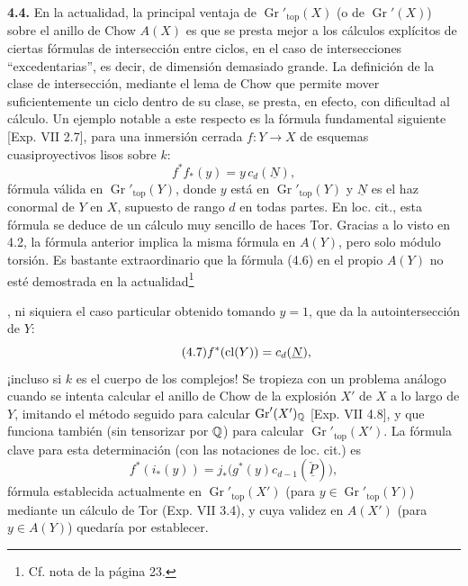 \textbf{4.4.} En la actualidad, la principal ventaja de
$\operatorname{Gr}'_{\mathrm{top}}(X)$ (o de $\operatorname{Gr}'(X)$) sobre
el anillo de Chow $A(X)$ es que se presta mejor a los cálculos explícitos de
ciertas fórmulas de intersección entre ciclos, en el caso de intersecciones
``excedentarias'', es decir, de dimensión demasiado grande. La definición de
la clase de intersección, mediante el lema de Chow que permite mover
suficientemente un ciclo dentro de su clase, se presta, en efecto, con
dificultad al cálculo. Un ejemplo notable a este respecto es la fórmula
fundamental siguiente [Exp. VII 2.7], para una inmersión cerrada $f:Y\to X$
de esquemas cuasiproyectivos lisos sobre $k$:
\begin{equation}\tag{4.6}
 f^*f_*(y)=y\,c_d(\underline N),
\end{equation}
fórmula válida en $\operatorname{Gr}'_{\mathrm{top}}(Y)$, donde $y$ está en
$\operatorname{Gr}'_{\mathrm{top}}(Y)$ y $\underline N$ es el haz conormal de
$Y$ en $X$, supuesto de rango $d$ en todas partes. En loc. cit., esta fórmula
se deduce de un cálculo muy sencillo de haces Tor. Gracias a lo visto en 4.2,
la fórmula anterior implica la misma fórmula en $A(Y)$, pero solo módulo
torsión. Es bastante extraordinario que la fórmula (4.6) en el propio $A(Y)$
no esté demostrada en la actualidad\begingroup\renewcommand{\thefootnote}{*}\footnote{Cf.
nota de la página 23.}\addtocounter{footnote}{-1}\endgroup, ni siquiera el
caso particular obtenido tomando $y=1$, que da la autointersección de $Y$:
\begin{equation}\tag{4.7}
 f^*(\operatorname{cl}(Y))=c_d(\underline N),
\end{equation}
¡incluso si $k$ es el cuerpo de los complejos! Se tropieza con un problema
análogo cuando se intenta calcular el anillo de Chow de la explosión
$X'$ de $X$ a lo largo de $Y$, imitando el método seguido para calcular
$\operatorname{Gr}'(X')_\mathbb Q$ [Exp. VII 4.8], y que funciona también (sin
tensorizar por $\mathbb Q$) para calcular $\operatorname{Gr}'_{\mathrm{top}}(X')$.
La fórmula clave para esta determinación (con las notaciones de loc. cit.) es
\begin{equation}\tag{4.8}
 f^*(i_*(y))=j_*\bigl(g^*(y)c_{d-1}(\underline{\check P})\bigr),
\end{equation}
fórmula establecida actualmente en $\operatorname{Gr}'_{\mathrm{top}}(X')$
(para $y\in\operatorname{Gr}'_{\mathrm{top}}(Y)$) mediante un cálculo de Tor
(Exp. VII 3.4), y cuya validez en $A(X')$ (para $y\in A(Y)$) quedaría por
establecer.

